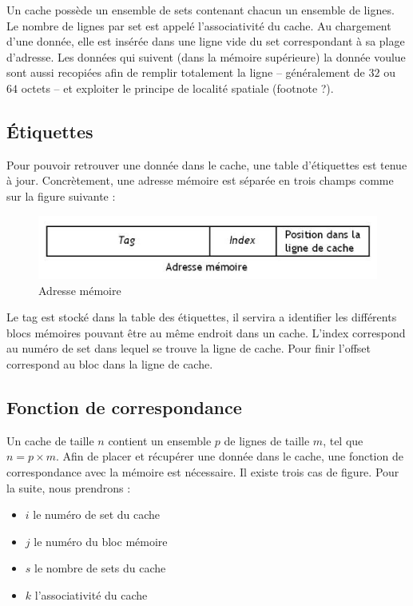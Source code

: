 Un cache possède un ensemble de sets contenant chacun un ensemble de lignes. Le nombre de lignes par set est appelé l'associativité du cache. Au chargement d'une donnée, elle est insérée dans une ligne vide du set correspondant à sa plage d'adresse. Les données qui suivent (dans la mémoire supérieure) la donnée voulue sont aussi recopiées afin de remplir totalement la ligne -- généralement de $32$ ou $64$ octets -- et exploiter le principe de localité spatiale (footnote ?).

\subsection{\'Etiquettes}
Pour pouvoir retrouver une donnée dans le cache, une table d'étiquettes est tenue à jour. Concrètement, une adresse mémoire est séparée en trois champs comme sur la figure suivante : \\

\begin{figure}[!h]
\begin{center}
   \includegraphics[scale=0.50]{images/etiquette.jpeg}
   \caption{\label{img:etiquette} Adresse mémoire}
\end{center}
\end{figure}


Le tag est stocké dans la table des étiquettes, il servira a identifier les différents blocs mémoires pouvant être au même endroit dans un cache. L'index correspond au numéro de set dans lequel se trouve la ligne de cache. Pour finir l'offset correspond au bloc dans la ligne de cache.

\subsection{Fonction de correspondance}
Un cache de taille $n$ contient un ensemble $p$ de lignes de taille $m$, tel que $n = p \times m$. Afin de placer et récupérer une donnée dans le cache, une fonction de correspondance avec la mémoire est nécessaire. Il existe trois cas de figure. Pour la suite, nous prendrons : \\
\begin{itemize}
\item $i$ le numéro de set du cache
\item $j$ le numéro du bloc mémoire
\item $s$ le nombre de sets du cache
\item $k$ l'associativité du cache 
\end{itemize}

